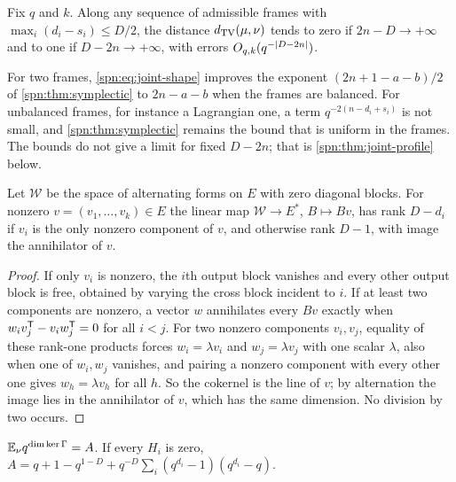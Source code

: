 \begin{corollary}\label{spn:cor:joint-transition}
Fix $q$ and $k$. Along any sequence of admissible frames with $\max_i(d_i-s_i)\le D/2$, the distance
$d_{\mathrm{TV}}(\mu,\nu)$ tends to zero if $2n-D\to+\infty$ and to one if $D-2n\to+\infty$, with errors
$O_{q,k}(q^{-\lvert D-2n\rvert})$.
\end{corollary}

For two frames, \eqref{spn:eq:joint-shape} improves the exponent $(2n+1-a-b)/2$ of
\cref{spn:thm:symplectic} to $2n-a-b$ when the frames are balanced. For unbalanced frames, for
instance a Lagrangian one, a term $q^{-2(n-d_i+s_i)}$ is not small, and \cref{spn:thm:symplectic}
remains the bound that is uniform in the frames. The bounds do not give a limit for fixed $D-2n$;
that is \cref{spn:thm:joint-profile} below.

\begin{lemma}\label{spn:lem:joint-eval}
Let $\mathcal W$ be the space of alternating forms on $E$ with zero diagonal blocks. For nonzero
$v=(v_1,\dots,v_k)\in E$ the linear map $\mathcal W\to E^*$, $B\mapsto Bv$, has rank $D-d_i$ if
$v_i$ is the only nonzero component of $v$, and otherwise rank $D-1$, with image the annihilator of
$v$.
\end{lemma}

\begin{proof}
If only $v_i$ is nonzero, the $i$th output block vanishes and every other output block is free,
obtained by varying the cross block incident to $i$. If at least two components are nonzero, a
vector $w$ annihilates every $Bv$ exactly when $w_iv_j^{\mathsf{T}}-v_iw_j^{\mathsf{T}}=0$ for all $i<j$. For two
nonzero components $v_i,v_j$, equality of these rank-one products forces $w_i=\lambda v_i$ and
$w_j=\lambda v_j$ with one scalar $\lambda$, also when one of $w_i,w_j$ vanishes, and pairing a
nonzero component with every other one gives $w_h=\lambda v_h$ for all $h$. So the cokernel is the
line of $v$; by alternation the image lies in the annihilator of $v$, which has the same dimension.
No division by two occurs.
\end{proof}

\begin{lemma}\label{spn:lem:joint-moment}
$\mathbb{E}_\nu q^{\dim\ker\Gamma}=A$. If every $H_i$ is zero,
$A=q+1-q^{1-D}+q^{-D}\sum_i(q^{d_i}-1)(q^{d_i}-q)$.
\end{lemma}

